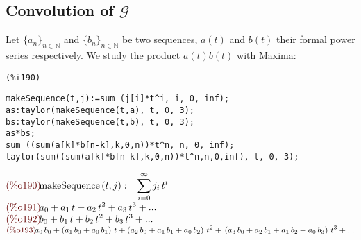 \subsection{Convolution of $\mathcal{G} $}

Let $\{a_n\}_{n\in\mathbb{N} }$ and $\{b_n\}_{n\in\mathbb{N} } $ be
two sequences, $a(t)$ and $b(t)$ their formal power series
respectively. We study the product $a(t)b(t)$ with Maxima:\\
\noindent
\begin{minipage}[t]{8ex}{\color{red}\bf
\begin{verbatim}
(%i190) 
\end{verbatim}}
\end{minipage}
\begin{minipage}[t]{\textwidth}{\color{blue}
\begin{verbatim}
makeSequence(t,j):=sum (j[i]*t^i, i, 0, inf);
as:taylor(makeSequence(t,a), t, 0, 3);
bs:taylor(makeSequence(t,b), t, 0, 3);
as*bs;
sum ((sum(a[k]*b[n-k],k,0,n))*t^n, n, 0, inf);
taylor(sum((sum(a[k]*b[n-k],k,0,n))*t^n,n,0,inf), t, 0, 3);
\end{verbatim}}
\end{minipage}
\begin{math}\displaystyle
\parbox{8ex}{\color{labelcolor}(\%o190) }
\mathrm{makeSequence}\left( t,j\right) :=\sum_{i=0}^{\infty }{j}_{i}\,{t}^{i}
\end{math}\\
\begin{math}\displaystyle
\parbox{8ex}{\color{labelcolor}(\%o191) }
{a}_{0}+{a}_{1}\,t+{a}_{2}\,{t}^{2}+{a}_{3}\,{t}^{3}+...
\end{math}\\
\begin{math}\displaystyle
\parbox{8ex}{\color{labelcolor}(\%o192) }
{b}_{0}+{b}_{1}\,t+{b}_{2}\,{t}^{2}+{b}_{3}\,{t}^{3}+...
\end{math}\\
\begin{math}\displaystyle
  \parbox{8ex}{\color{labelcolor}(\%o193) } {a}_{0}\,{b}_{0}+\left(
    {a}_{1}\,{b}_{0}+{a}_{0}\,{b}_{1}\right) \,t+\left(
    {a}_{2}\,{b}_{0}+{a}_{1}\,{b}_{1}+{a}_{0}\,{b}_{2}\right)
  \,{t}^{2}+\\
  \left(
    {a}_{3}\,{b}_{0}+{a}_{2}\,{b}_{1}+{a}_{1}\,{b}_{2}+{a}_{0}\,{b}_{3}\right)
  \,{t}^{3}+...
\end{math}\\
